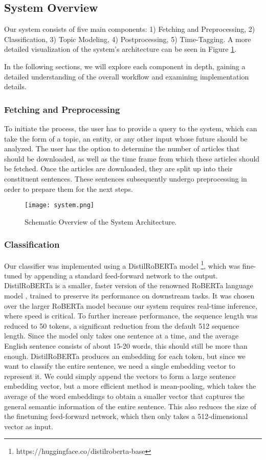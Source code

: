 \documentclass[sigconf]{acmart}
\begin{document}
\subsection{System Overview}
Our system consists of five main components: 1) Fetching and Preprocessing, 2) Classification, 3) Topic Modeling, 4) Postprocessing, 5) Time-Tagging. A more detailed visualization of the system's architecture can be seen in Figure \ref{fig:archi}.

In the following sections, we will explore each component in depth, gaining a detailed understanding of the overall workflow and examining implementation details.

\subsubsection{Fetching and Preprocessing}
To initiate the process, the user has to provide a query to the system, which can take the form of a topic, an entity, or any other input whose future should be analyzed. The user has the option to determine the number of articles that should be downloaded, as well as the time frame from which these articles should be fetched. Once the articles are downloaded, they are split up into their constituent sentences. These sentences subsequently undergo preprocessing in order to prepare them for the next steps.

\begin{figure}[t]
\centering
\texttt{[image: system.png]}
\caption{Schematic Overview of the System Architecture.}
\label{fig:archi}
\end{figure}

\subsubsection{Classification}
Our classifier was implemented using a DistilRoBERTa model \footnote{https://huggingface.co/distilroberta-base}, which was fine-tuned by appending a standard feed-forward network to the output. DistilRoBERTa is a smaller, faster version of the renowned RoBERTa language model \cite{roberta}, trained to preserve its performance on downstream tasks. It was chosen over the larger RoBERTa model because our system requires real-time inference, where speed is critical. To further increase performance, the sequence length was reduced to 50 tokens, a significant reduction from the default 512 sequence length. Since the model only takes one sentence at a time, and the average English sentence consists of about 15-20 words, this should still be more than enough.
DistilRoBERTa produces an embedding for each token, but since we want to classify the entire sentence, we need a single embedding vector to represent it. We could simply append the vectors to form a large sentence embedding vector, but a more efficient method is mean-pooling, which takes the average of the word embeddings to obtain a smaller vector that captures the general semantic information of the entire sentence. This also reduces the size of the finetuning feed-forward network, which then only takes a 512-dimensional vector as input.
\end{document}
